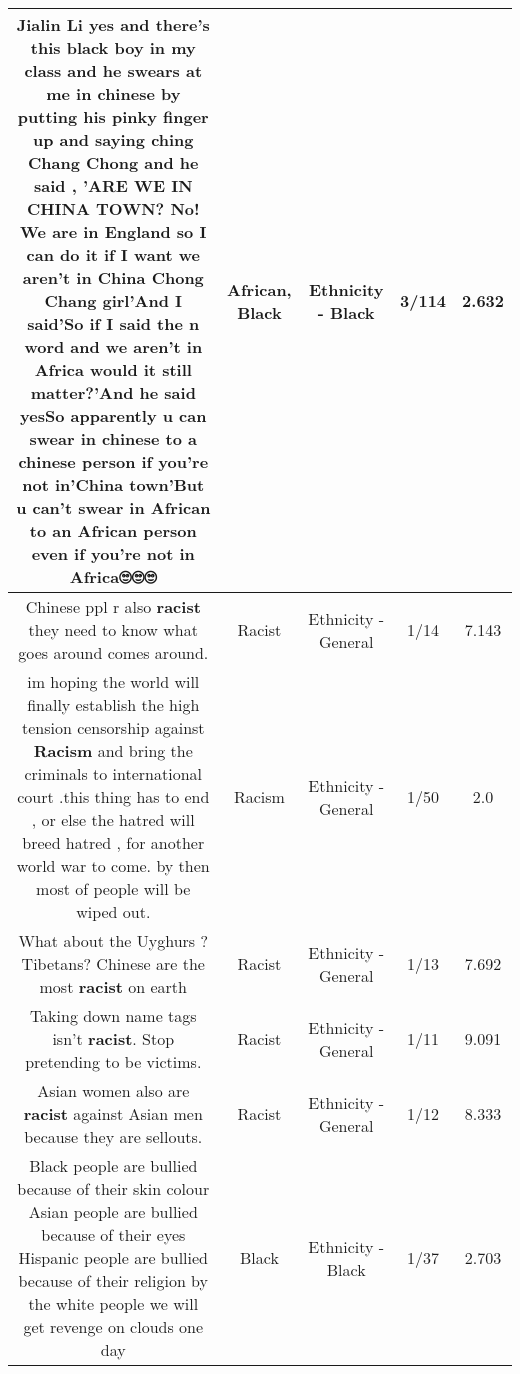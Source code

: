 \documentclass[11pt]{article}
\newlength\mylength
\begin{document}
\begin{center}
\begin{longtable}{|C{.65\mylength}|C{.30\mylength}|C{.12\mylength}|C{.12\mylength}|C{.12\mylength}|}
  \small Jialin Li yes and there's this \textbf{black} boy in my class and he swears at me in chinese by putting his pinky finger up and saying ching Chang Chong and he said , 'ARE WE IN CHINA TOWN? No! We are in England so I can do it if I want we aren't in China Chong Chang girl'And I said'So if I said the n word and we aren't in Africa would it still matter?'And he said yesSo apparently u can swear in chinese to a chinese person if you're not in'China town'But u can't swear in \textbf{African} to an \textbf{African} person even if you're not in Africa🙄🙄🙄\normalsize   & African, Black & Ethnicity - Black & 3/114 & 2.632 \\  \hline
  \small Chinese ppl r also \textbf{racist} they need to know what goes around comes around.\normalsize   & Racist & Ethnicity - General & 1/14 & 7.143 \\  \hline
  \small im hoping the world will finally establish the high tension censorship against \textbf{Racism} and bring the criminals to international court .this thing has to end , or else the hatred will breed hatred , for another world war to come. by then most of people will be wiped out.\normalsize   & Racism & Ethnicity - General & 1/50 & 2.0 \\  \hline
  \small What about the Uyghurs ? Tibetans?  Chinese are the most \textbf{racist} on earth\normalsize   & Racist & Ethnicity - General & 1/13 & 7.692 \\  \hline
  \small Taking down name tags isn't \textbf{racist}.  Stop pretending to be victims.\normalsize   & Racist & Ethnicity - General & 1/11 & 9.091 \\  \hline
  \small Asian women also are \textbf{racist} against Asian men because they are sellouts.\normalsize   & Racist & Ethnicity - General & 1/12 & 8.333 \\  \hline
  \small Black people are bullied because of their skin colour Asian people are bullied because of their eyes Hispanic people are bullied because of their religion by the white people we will get revenge on clouds one day\normalsize   & Black & Ethnicity - Black & 1/37 & 2.703 \\  \hline

\end{longtable}
\end{center}
\end{document}
